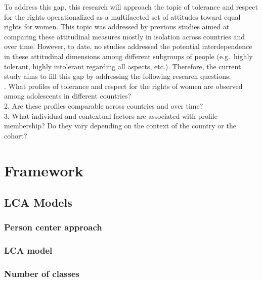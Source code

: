 \documentclass[12pt,twoside]{reedthesis}
\begin{document}
\newline 
To address this gap, this research will approach the topic of tolerance and respect for the rights operationalized as a multifaceted set of attitudes toward equal rights for women. This topic was addressed by previous studies aimed at comparing these attitudinal measures mostly in isolation across countries and over time. However, to date, no studies addressed the potential interdependence in these attitudinal dimensions among different subgroups of people (e.g.~highly tolerant, highly intolerant regarding all aspects, etc.). Therefore, the current study aims to fill this gap by addressing the following research questions:\\
. What profiles of tolerance and respect for the rights of women are observed among adolescents in different countries?\\
2. Are these profiles comparable across countries and over time?\\
3. What individual and contextual factors are associated with profile membership? Do they vary depending on the context of the country or the cohort?

\hypertarget{framework}{%
\chapter{Framework}\label{framework}}

\hypertarget{lca-models}{%
\section{LCA Models}\label{lca-models}}

\hypertarget{person-center-approach}{%
\subsection{Person center approach}\label{person-center-approach}}

\hypertarget{lca-model}{%
\subsection{LCA model}\label{lca-model}}

\hypertarget{number-of-classes}{%
\subsection{Number of classes}\label{number-of-classes}}
\end{document}
